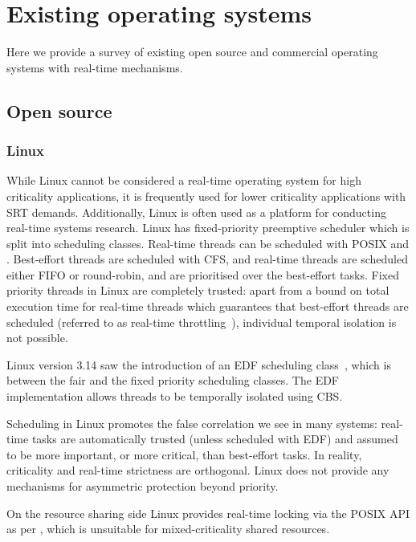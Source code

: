 \section{Existing operating systems}

Here we provide a survey of existing open source and commercial operating systems with
real-time mechanisms. 

\subsection{Open source}

\subsubsection{Linux}

While Linux cannot be considered a real-time operating system for high criticality applications, it
is frequently used for lower criticality applications with \gls{SRT} demands.  Additionally, Linux
is often used as a platform for conducting real-time systems research. 
Linux has fixed-priority preemptive scheduler which is split into scheduling classes.  Real-time
threads can be scheduled with \gls{POSIX} \schedfifo and \schedsporadic. Best-effort threads are
scheduled with \gls{CFS}, and real-time threads are scheduled either \gls{FIFO} or round-robin, and
are prioritised over the best-effort tasks.  Fixed priority threads in Linux are completely trusted:
apart from a bound on total execution time for real-time threads which guarantees that best-effort
threads are scheduled (referred to as real-time throttling~\citep{Corbet_08}), individual temporal
isolation is not possible.

Linux version 3.14 saw the introduction of an \gls{EDF} scheduling class~\citep{Corbet_09},
which is between the fair and the fixed priority scheduling classes.  The \gls{EDF} implementation
allows threads to be temporally isolated using \gls{CBS}.

Scheduling in Linux promotes the false correlation we see in many systems: real-time tasks are
automatically trusted (unless scheduled with \gls{EDF}) and assumed to be more important, or more
critical, than best-effort tasks.  In reality, criticality and real-time strictness are orthogonal.
Linux does not provide any mechanisms for asymmetric protection beyond priority.

On the resource sharing side Linux provides real-time locking via the \gls{POSIX} API as per
, which is unsuitable for mixed-criticality shared resources.

